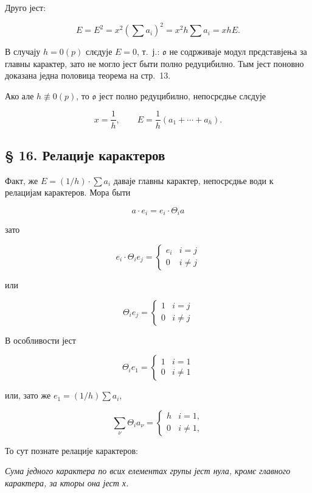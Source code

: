 \documentclass[11pt]{article}
\begin{document}
Друго јест:

\[
E=E^2=x^2\left(\sum a_i\right)^2=x^2h\sum a_i=xhE.
\]

В случају \(h=0(p)\) слєдује \(E=0\), т.~ј.: \(\mathfrak o\) не содрживаје модул прєдставјења за главны карактер, зато не могло јест быти полно редуцибилно. Тым јест поновно доказана једна половица теорема на стр.~13.

Ако але \(h\not\equiv0(p)\), то \(\mathfrak o\) јест полно редуцибилно, непосрєдње слєдује

\[
x=\frac{1}{h},\qquad E=\frac{1}{h}(a_1+\cdots+a_h).
\]

\subsection*{§ 16. Релације карактеров}\label{die-charakterenrelationen}

Факт, же \(E=(1/h)\cdot\sum a_i\) даваје главны карактер, непосрєдње води к релацијам карактеров. Мора быти

\[a \cdot e_i = e_i \cdot \Theta_i a\]

зато

\[e_i \cdot \Theta_i e_j = \begin{cases} e_i & i = j \\ 0 & i \neq j \end{cases}\]

или

\[\Theta_i e_j = \begin{cases} 1 & i = j \\ 0 & i \neq j \end{cases}\]

В особливости јест

\[\Theta_i e_1 = \begin{cases} 1 & i = 1 \\ 0 & i \neq 1 \end{cases}\]

или, зато же \(e_1 = (1/h) \sum a_i\),

\[
\sum_\nu \Theta_i a_\nu=\begin{cases} h & i=1,\\ 0 & i\ne 1, \end{cases}
\]

То сут познате релације карактеров:

\emph{Сума једного карактера по всих елементах групы јест нула, кромє главного карактера, за кторы она јест х.}
\end{document}
